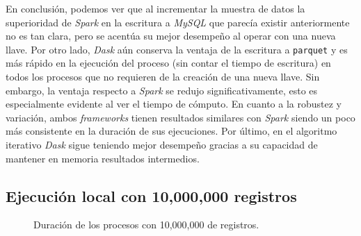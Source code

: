 En conclusión, podemos ver que al incrementar la muestra de datos la superioridad de \textit{Spark} en la escritura a \textit{MySQL} que parecía existir anteriormente no es tan clara, pero se acentúa su mejor desempeño al operar con una nueva llave. Por otro lado, \textit{Dask} aún conserva la ventaja de la escritura a \texttt{parquet} y es más rápido en la ejecución del proceso (sin contar el tiempo de escritura) en todos los procesos que no requieren de la creación de una nueva llave. Sin embargo, la ventaja respecto a \textit{Spark} se redujo significativamente, esto es especialmente evidente al ver el tiempo de cómputo. En cuanto a la robustez y variación, ambos \textit{frameworks} tienen resultados similares con \textit{Spark} siendo un poco más consistente en la duración de sus ejecuciones. Por último, en el algoritmo iterativo \textit{Dask} sigue teniendo mejor desempeño gracias a su capacidad de mantener en memoria resultados intermedios.

\subsection{Ejecución local con 10,000,000 registros}

\begin{center}
\begin{figure}
\caption{Duración de los procesos con 10,000,000 de registros.}
\label{barras:duracion10M}
\end{figure}
\end{center}

